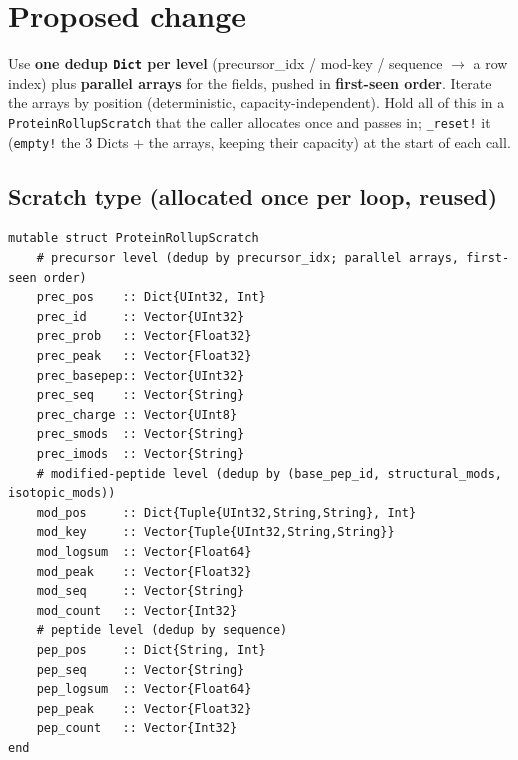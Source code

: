 \documentclass[11pt]{article}
\begin{document}
\section{Proposed change}\label{sec:proposal}
Use \textbf{one dedup \texttt{Dict} per level} (precursor\_idx / mod-key / sequence
$\rightarrow$ a row index) plus \textbf{parallel arrays} for the fields, pushed in
\textbf{first-seen order}. Iterate the arrays by position (deterministic,
capacity-independent). Hold all of this in a \texttt{ProteinRollupScratch} that the
caller allocates once and passes in; \texttt{\_reset!} it (\texttt{empty!} the 3
Dicts + the arrays, keeping their capacity) at the start of each call.

\subsection*{Scratch type (allocated once per loop, reused)}
\begin{lstlisting}
mutable struct ProteinRollupScratch
    # precursor level (dedup by precursor_idx; parallel arrays, first-seen order)
    prec_pos    :: Dict{UInt32, Int}
    prec_id     :: Vector{UInt32}
    prec_prob   :: Vector{Float32}
    prec_peak   :: Vector{Float32}
    prec_basepep:: Vector{UInt32}
    prec_seq    :: Vector{String}
    prec_charge :: Vector{UInt8}
    prec_smods  :: Vector{String}
    prec_imods  :: Vector{String}
    # modified-peptide level (dedup by (base_pep_id, structural_mods, isotopic_mods))
    mod_pos     :: Dict{Tuple{UInt32,String,String}, Int}
    mod_key     :: Vector{Tuple{UInt32,String,String}}
    mod_logsum  :: Vector{Float64}
    mod_peak    :: Vector{Float32}
    mod_seq     :: Vector{String}
    mod_count   :: Vector{Int32}
    # peptide level (dedup by sequence)
    pep_pos     :: Dict{String, Int}
    pep_seq     :: Vector{String}
    pep_logsum  :: Vector{Float64}
    pep_peak    :: Vector{Float32}
    pep_count   :: Vector{Int32}
end
\end{lstlisting}
\end{document}
